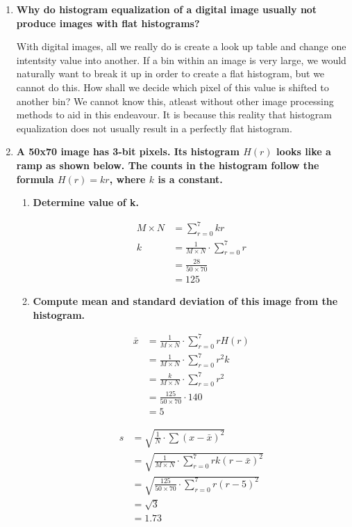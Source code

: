 \begin{enumerate}[font=\bfseries]
    \item \textbf{Why do histogram equalization of a digital image usually not
    produce images with flat histograms?}

    With digital images, all we really do is create a look up table and change
    one intentsity value into another. If a bin within an image is very large,
    we would naturally want to break it up in order to create a flat histogram,
    but we cannot do this. How shall we decide which pixel of this value is
    shifted to another bin? We cannot know this, atleast without other image
    processing methods to aid in this endeavour. It is because this reality that
    histogram equalization does not usually result in a perfectly flat
    histogram.

    \item \textbf{A 50x70 image has 3-bit pixels. Its histogram $H(r)$ looks
    like a ramp as shown below. The counts in the histogram follow the formula
    $H(r)=kr$, where $k$ is a constant.}

    \begin{enumerate}[font=\bfseries, label=\alph*.]
    
	\item \textbf{Determine value of k.}
	
	\begin{align*}
	    M \times N &= \sum_{r=0}^{7}kr \\
	    k &= \frac{1}{M \times N}\cdot\sum_{r=0}^{7}r \\
	    &= \frac{28}{50 \times 70} \\
	    &= 125
	\end{align*}

	\item \textbf{Compute mean and standard deviation of this image from the
	histogram.}

	\begin{align*}
	    \bar{x} &= \frac{1}{M \times N}\cdot\sum_{r=0}^{7}rH(r) \\
	    &= \frac{1}{M \times N}\cdot\sum_{r=0}^{7}r^{2}k \\
	    &= \frac{k}{M \times N}\cdot\sum_{r=0}^{7}r^{2} \\
	    &= \frac{125}{50 \times 70}\cdot140 \\
	    &= 5
	\end{align*}

	\begin{align*}
	    s &= \sqrt{\frac{1}{N}\cdot\sum(x - \bar{x})^{2}} \\
	    &= \sqrt{\frac{1}{M \times N}\cdot\sum_{r=0}^{7}rk(r -
		\bar{x})^{2}}\\
	    &= \sqrt{\frac{125}{50 \times 70}\cdot\sum_{r=0}^{7}r(r -
		5)^{2}} \\
	    &= \sqrt{3} \\
	    &= 1.73
	\end{align*}
	

\end{enumerate}
\end{enumerate}
